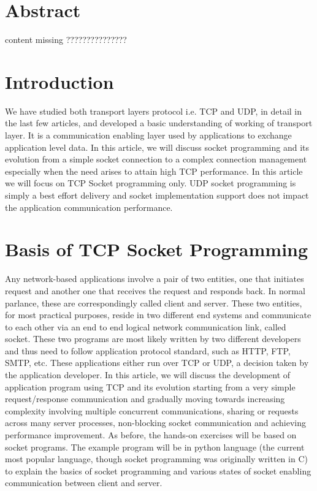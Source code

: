 \begin{multicols}{2}


\section*{Abstract}

content missing ???????????????

\section{Introduction}
 
 We have studied both transport layers protocol i.e. TCP\cite{art1-key01} and UDP\cite{art1-key02}, in detail in the last few articles, and developed a basic understanding of working of transport layer. It is a communication enabling layer used by applications to exchange application level data. In this article, we will discuss socket programming and its evolution from a simple socket connection to a complex connection management especially when the need arises to attain high TCP performance.  In this article we will focus on TCP Socket programming only. UDP socket programming is simply a best effort delivery and socket implementation support does not impact the application communication performance.

\section{Basis of TCP Socket Programming}

Any network-based applications involve a pair of two entities, one that initiates request and another one that receives the request and responds back. In normal parlance, these are correspondingly called client and server. These two entities, for most practical purposes, reside in two different end systems and communicate to each other via an end to end logical network communication link, called socket. These two programs are most likely written by two different developers and thus need to follow application protocol standard, such as HTTP, FTP, SMTP, etc.  These applications either run over TCP or UDP, a decision taken by the application developer. In this article, we will discuss the development of application program using TCP and its evolution starting from a very simple request/response communication and gradually moving towards increasing complexity involving multiple concurrent communications, sharing or requests across many server processes, non-blocking socket communication and achieving performance improvement. As before, the hands-on exercises will be based on socket programs.  The example program will be in python language (the current most popular language, though socket programming was originally written in C) to explain the basics of socket programming and various states of socket enabling communication between client and server.


\end{multicols}
